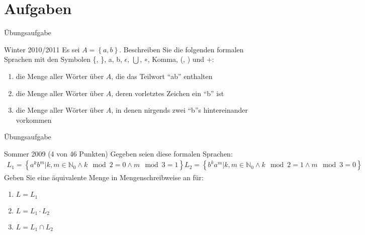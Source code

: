 \section{Aufgaben}
\begin{frame}{Übungsaufgabe}
    \begin{exampleblock}{Winter 2010/2011}
        Es sei $A = \left\{a, b\right\}$. Beschreiben Sie die folgenden formalen Sprachen mit den Symbolen \{, \}, a, b, $\epsilon$, $\bigcup$, ∗, Komma, (, ) und +:
        \begin{enumerate}
            \item die Menge aller Wörter über $A$, die das Teilwort "`ab"' enthalten
            \item die Menge aller Wörter über $A$, deren vorletztes Zeichen ein "`b"' ist
            \item die Menge aller Wörter über $A$, in denen nirgends zwei "`b"'s hintereinander vorkommen
        \end{enumerate}
    \end{exampleblock}
\end{frame}
\begin{frame}{Übungsaufgabe}
    \begin{exampleblock}{Sommer 2009 (4 von 46 Punkten)}
        Gegeben seien diese formalen Sprachen:
        \begin{align*}
            L_1 = \left\{ a^k b^m | k, m \in \mathbb{N}_0 \wedge k \mod 2 = 0 \wedge m \mod 3 = 1\right\}
            L_2 = \left\{ b^k a^m | k, m \in \mathbb{N}_0 \wedge k \mod 2 = 1 \wedge m \mod 3 = 0\right\}
        \end{align*}
        Geben Sie eine äquivalente Menge in Mengenschreibweise an für:
        \begin{enumerate}
            \item $L = L_1$
            \item $L = L_1 \cdot L_2$
            \item $L = L_1 \cap L_2$
        \end{enumerate}
    \end{exampleblock}
\end{frame}

